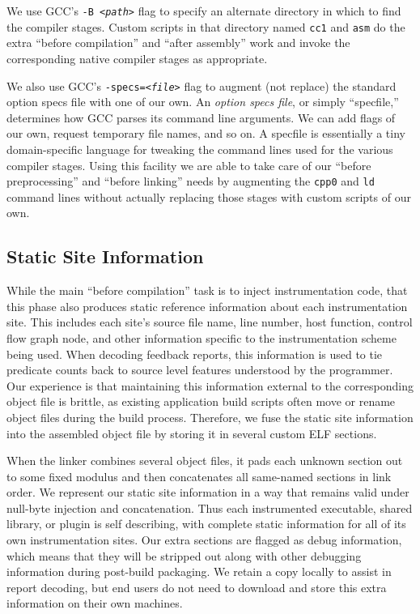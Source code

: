 \documentclass[10pt,twocolumn]{article}
\newcommand{\termdef}[1]{\emph{#1}}
\begin{document}
We use GCC's \texttt{-B \textit{<path>}} flag to specify an alternate
directory in which to find the compiler stages.  Custom scripts in
that directory named \texttt{cc1} and \texttt{asm} do the extra
``before compilation'' and ``after assembly'' work and invoke the
corresponding native compiler stages as appropriate.

We also use GCC's \texttt{-specs=\textit{<file>}} flag to augment (not
replace) the standard option specs file with one of our own.  An
\termdef{option specs file}, or simply ``specfile,'' determines how
GCC parses its command line arguments.  We can add flags of our own,
request temporary file names, and so on.  A specfile is essentially a
tiny domain-specific language for tweaking the command lines used for
the various compiler stages.  Using this facility we are able to take
care of our ``before preprocessing'' and ``before linking'' needs by
augmenting the \texttt{cpp0} and \texttt{ld} command lines without
actually replacing those stages with custom scripts of our own.

\subsection{Static Site Information}

While the main ``before compilation'' task is to inject
instrumentation code, that this phase also produces static reference
information about each instrumentation site.  This includes each
site's source file name, line number, host function, control flow
graph node, and other information specific to the instrumentation
scheme being used.  When decoding feedback reports, this information
is used to tie predicate counts back to source level features
understood by the programmer.  Our experience is that maintaining this
information external to the corresponding object file is brittle, as
existing application build scripts often move or rename object files
during the build process.  Therefore, we fuse the static site
information into the assembled object file by storing it in several
custom ELF sections.

When the linker combines several object files, it pads each unknown
section out to some fixed modulus and then concatenates all same-named
sections in link order.  We represent our static site information in a
way that remains valid under null-byte injection and concatenation.
Thus each instrumented executable, shared library, or plugin is self
describing, with complete static information for all of its own
instrumentation sites.  Our extra sections are flagged as debug
information, which means that they will be stripped out along with
other debugging information during post-build packaging.  We retain a
copy locally to assist in report decoding, but end users do not need
to download and store this extra information on their own machines.
\end{document}
